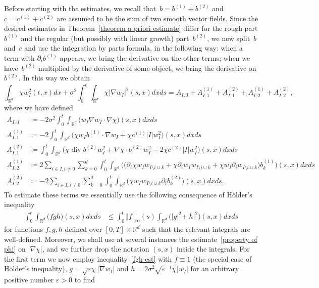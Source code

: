 \documentclass[a4paper,10pt]{article}
\newcommand\1{\mathbbm{1}}
\newcommand{\eps}{\varepsilon}
\DeclareMathOperator{\diverg}{div}
\numberwithin{equation}{section}
\begin{document}
Before starting with the estimates, we recall that~$b=b^{(1)}+b^{(2)}$ and $c=c^{(1)}+c^{(2)}$ are assumed to be the sum of two smooth vector fields. Since the desired estimates in Theorem~\ref{theorem a priori estimate} differ for the rough part $b^{(1)}$ and the regular (but possibly with linear growth) part~$b^{(2)}$, we now split~$b$ and~$c$ and use the integration by parts formula, in the following way: when a term with $\partial_i b^{(1)}$ appears, we bring the derivative on the other terms; when we have~$b^{(2)}$ multiplied by the derivative of some object, we bring the derivative on $b^{(2)}$. In this way we obtain
\begin{equation*}
\int_{\mathbb{R}^{d}}\chi w_{I}^{2}(t,x)  dx+\sigma^{2} 
\int_{0}^{t}\int_{\mathbb{R}^{d}}\chi\vert \nabla w_{I}\vert
^{2}(s,x) dxds 
=A_{I,0}+A_{I,1}^{(1)}+A_{I,1}^{(2)} 
+A_{I,2}^{(1)}+A_{I,2}^{(2)},
\end{equation*}
where we have defined
\begin{align*}
A_{I,0} &  \coloneqq -2\sigma^{2}\int_{0}^{t}\int_{\mathbb{R}^{d}} \big( w_{I}\nabla
w_{I}\cdot\nabla\chi \big) (s,x) dxds\\
A_{I,1}^{(1)} & \coloneqq -2\int_{0}^{t}\int_{\mathbb{R}^{d}} \big(
\chi w_{I}b^{(1)}\cdot\nabla w_{I}+\chi c^{(1)
}\vert I\vert w_{I}^{2}\big)  (s,x)  dxds\\
A_{I,1}^{(2)} & \coloneqq \int_{0}^{t}\int_{\mathbb{R}^{d}} \big(
\chi \diverg  b^{(2)} w_{I}^2 + \nabla \chi \cdot b^{(2)} w_{I}^{2} - 2 \chi c^{(2)
}\vert I\vert w_{I}^{2} \big)  (s,x)  dxds\\
A_{I,2}^{(1)} & \coloneqq  2\sum_{i\in I,i\neq0}\sum_{k=0}^{d}\int
_{0}^{t}\int_{\mathbb{R}^{d}} \big( \big( \partial_{i} \chi w_{I}w_{I\setminus i\cup k} + \chi \partial_{i} w_{I} w_{I\setminus i\cup k} + \chi w_{I} \partial_{i} w_{I\setminus i\cup k} \big) b_{k}^{(1)}\big) (s,x) dxds \\
A_{I,2}^{(2)} & \coloneqq -2\sum_{i\in I,i\neq0}\sum_{k=0}^{d}\int_{0}^{t} \int_{\mathbb{R}^{d}} \big(\chi w_{I}w_{I\setminus i\cup k} \partial_{i}b_{k}^{(2)}\big) (s,x) dxds .
\end{align*}
To estimate these terms we essentially use the following consequence of H\"older's inequality
\begin{align}
\label{fgh-est}
\int_{0}^{t}\int_{\mathbb{R}^{d}} \big(f g h \big) (s,x) dxds & \leq \int_{0}^{t} \Vert f \Vert _{\infty}(s)  \int_{\mathbb{R}^{d}} \big( \vert g \vert^2  + \vert h \vert^2 \big)(s,x) dx ds
\end{align}
for functions $f,g,h$ defined over $[0,T] \times \mathbb{R}^d$ such that the relevant integrals are well-defined. Moreover, we shall use at several instances the estimate~\eqref{property of phi} on $\vert \nabla \chi \vert$, and we further drop the notation $(s,x)$ inside the integrals. For the first term we now employ inequality~\eqref{fgh-est} with $f \equiv 1$ (the special case of H\"older's inequality), $g = \sqrt{\eps \chi} \vert \nabla w_{I}\vert$ and $h = 2\sigma^{2} \sqrt{\eps^{-1} \chi} \vert w_{I}\vert$ for an arbitrary positive number $\eps > 0$ to find 
\end{document}
